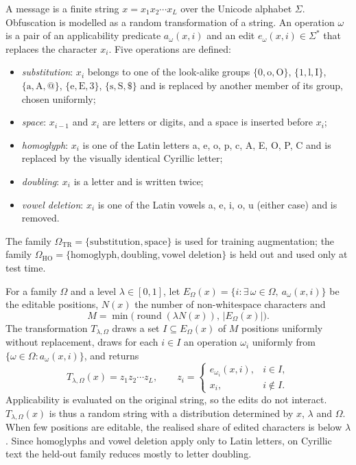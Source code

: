 A message is a finite string $x=x_1x_2\cdots x_L$ over the Unicode alphabet $\Sigma$. Obfuscation is modelled as a random transformation of a string. An operation $\omega$ is a pair of an applicability predicate $a_\omega(x,i)$ and an edit $e_\omega(x,i)\in\Sigma^{*}$ that replaces the character $x_i$. Five operations are defined:
\begin{itemize}
\item \emph{substitution}: $x_i$ belongs to one of the look-alike groups $\{0,\mathrm{o},\mathrm{O}\}$, $\{1,\mathrm{l},\mathrm{I}\}$, $\{\mathrm{a},\mathrm{A},@\}$, $\{\mathrm{e},\mathrm{E},3\}$, $\{\mathrm{s},\mathrm{S},\$\}$ and is replaced by another member of its group, chosen uniformly;
\item \emph{space}: $x_{i-1}$ and $x_i$ are letters or digits, and a space is inserted before $x_i$;
\item \emph{homoglyph}: $x_i$ is one of the Latin letters a, e, o, p, c, A, E, O, P, C and is replaced by the visually identical Cyrillic letter;
\item \emph{doubling}: $x_i$ is a letter and is written twice;
\item \emph{vowel deletion}: $x_i$ is one of the Latin vowels a, e, i, o, u (either case) and is removed.
\end{itemize}
The family $\Omega_{\mathrm{TR}}=\{\text{substitution},\text{space}\}$ is used for training augmentation; the family $\Omega_{\mathrm{HO}}=\{\text{homoglyph},\text{doubling},\text{vowel deletion}\}$ is held out and used only at test time.

For a family $\Omega$ and a level $\lambda\in[0,1]$, let $E_\Omega(x)=\{i:\exists\,\omega\in\Omega,\ a_\omega(x,i)\}$ be the editable positions, $N(x)$ the number of non-whitespace characters and
\begin{equation}\label{eq:nops}
M=\min\bigl(\operatorname{round}(\lambda N(x)),\,|E_\Omega(x)|\bigr).
\end{equation}
The transformation $T_{\lambda,\Omega}$ draws a set $I\subseteq E_\Omega(x)$ of $M$ positions uniformly without replacement, draws for each $i\in I$ an operation $\omega_i$ uniformly from $\{\omega\in\Omega:a_\omega(x,i)\}$, and returns
\begin{equation}\label{eq:obf}
T_{\lambda,\Omega}(x)=z_1z_2\cdots z_L,\qquad z_i=\begin{cases}e_{\omega_i}(x,i),& i\in I,\\ x_i,& i\notin I.\end{cases}
\end{equation}
Applicability is evaluated on the original string, so the edits do not interact. $T_{\lambda,\Omega}(x)$ is thus a random string with a distribution determined by $x$, $\lambda$ and $\Omega$. When few positions are editable, the realised share of edited characters is below $\lambda$. Since homoglyphs and vowel deletion apply only to Latin letters, on Cyrillic text the held-out family reduces mostly to letter doubling.

